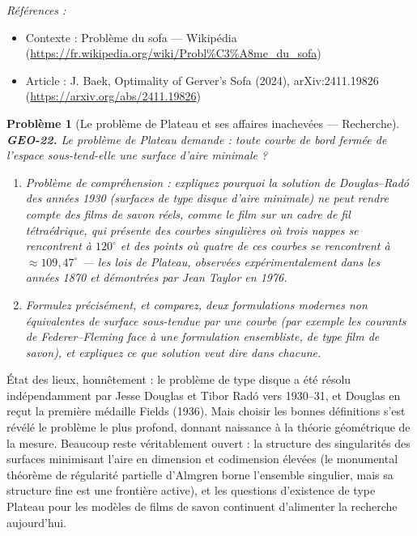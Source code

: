 \documentclass[11pt]{article}
\newtheorem{problem}{Problème}
\newenvironment{refs}{\par\small\noindent\emph{Références :}\begin{itemize}\setlength\itemsep{0pt}}{\end{itemize}\normalsize}
\begin{document}
\begin{refs}
\item Contexte : Problème du sofa --- Wikipédia (\url{https://fr.wikipedia.org/wiki/Probl%C3%A8me_du_sofa})
\item Article : J. Baek, \og{} Optimality of Gerver's Sofa \fg{} (2024), arXiv:2411.19826 (\url{https://arxiv.org/abs/2411.19826})
\end{refs}

\bigskip

\begin{problem}[{Le problème de Plateau et ses affaires inachevées --- Recherche}]
\textbf{GEO-22.} Le problème de Plateau demande : toute courbe de bord fermée de l'espace
sous-tend-elle une surface d'aire minimale ?
\begin{enumerate}
\item[(a)] Problème de compréhension : expliquez pourquoi la solution de Douglas--Radó des années 1930
(surfaces \textit{de type disque} d'aire minimale) ne peut rendre compte des films de savon réels,
comme le film sur un cadre de fil tétraédrique, qui présente des courbes singulières où trois
nappes se rencontrent à $ 120^\circ $ et des points où quatre de ces courbes se rencontrent à
$ \approx 109{,}47^\circ $ --- les lois de Plateau, observées expérimentalement dans les années
1870 et démontrées par Jean Taylor en 1976.
\item[(b)] Formulez précisément, et comparez, deux formulations modernes non équivalentes de \og{} surface
sous-tendue par une courbe \fg{} (par exemple les courants de Federer--Fleming face à une formulation
ensembliste, de type film de savon), et expliquez ce que \og{} solution \fg{} veut dire dans chacune.
\end{enumerate}

\end{problem}

\noindent État des lieux, honnêtement : le problème de type disque a été résolu
indépendamment par Jesse Douglas et Tibor Radó vers 1930--31, et Douglas en reçut la première
médaille Fields (1936). Mais choisir les bonnes définitions s'est révélé le problème le plus
profond, donnant naissance à la théorie géométrique de la mesure. Beaucoup reste véritablement
ouvert : la structure des singularités des surfaces minimisant l'aire en dimension et codimension
élevées (le monumental théorème de régularité partielle d'Almgren borne l'ensemble singulier, mais
sa structure fine est une frontière active), et les questions d'existence de type Plateau pour les
modèles de films de savon continuent d'alimenter la recherche aujourd'hui.
\end{document}
